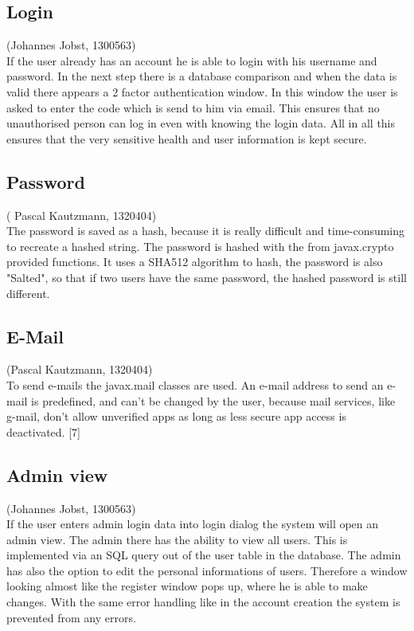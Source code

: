 \documentclass[a4paper, 12pt]{report}
\begin{document}
\subsection{Login}
{\tiny (Johannes Jobst, 1300563)\\}
If the user already has an account he is able to login with his username and password. In the next step there is a database comparison and when the data is valid there appears a 2 factor authentication window. In this window the user is asked to enter the code which is send to him via email. This ensures that no unauthorised person can log in even with knowing the login data. All in all this ensures that the very sensitive health and user information is kept secure.

\subsection{Password}
{\tiny ( Pascal Kautzmann, 1320404)\\}
The password is saved as a hash, because it is really difficult and time-consuming to recreate a hashed string.
The password is hashed with the from javax.crypto provided functions. It uses a SHA512 algorithm to hash, the password is also "Salted", so that if two users have the same password, the hashed password is still different.

\subsection{E-Mail}
{\tiny (Pascal Kautzmann, 1320404)\\}
To send e-mails the javax.mail classes are used. An e-mail address to send an e-mail is predefined, and can't be changed by the user,
because mail services, like g-mail, don't allow unverified apps as long as  less secure app access is deactivated. [7]


\subsection{Admin view}
{\tiny (Johannes Jobst, 1300563)\\}
If the user enters admin login data into login dialog the system will open an admin view. The admin there has the ability to view all users. This is implemented via an SQL query out of the user table in the database. The admin has also the option to edit the personal informations of users. Therefore a window looking almost like the register window pops up, where he is able to make changes.
With the same error handling like in the account creation the system is prevented from any errors.
\end{document}
